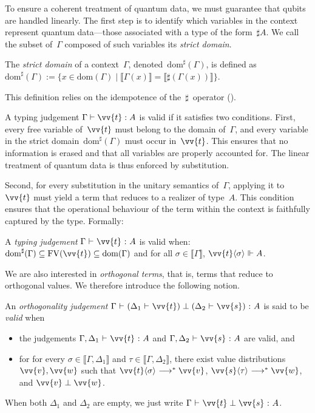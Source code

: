 \documentclass[runningheads,orivec,envcountsame,envcountsect]{llncs}
\newcommand\lra{\longrightarrow}
\newcommand\ansubst[2]{\ensuremath{\langle #1 \rangle_{#2}}}
\newcommand\dom[1]{\mathrm{dom}(#1)}
\newcommand\sdom[1]{\mathrm{dom}^{\sharp}(#1)}
\newcommand\FV[1]{\mathrm{FV}(#1)}
\def\eval{\lra^*}
\def\sem#1{\llbracket#1\rrbracket}
\def\TYP#1#2#3{#1~{\vdash}~#2~{:}~#3}
\def\SORTH#1#2#3#4{#1~{\vdash}~#2\perp#3~{:}~#4}
\def\ORTH#1#2#3#4#5#6{#1~{\vdash}~(#2~{\vdash}~#3)\perp(#4~{\vdash}~#5)~{:}~#6}
\def\real{\Vdash}
\begin{document}
To ensure a coherent treatment of quantum data, we must guarantee that qubits
are handled linearly. The first step is to identify which variables in the
context represent quantum data---those associated with a type of the
form~$\sharp A$. We call the subset of~$\Gamma$ composed of such variables its
\emph{strict domain}.

\begin{definition}
  The \emph{strict domain} of a context~$\Gamma$, denoted~$\sdom{\Gamma}$, is
  defined as
  \(
    \sdom{\Gamma} :=
    \{x \in \dom{\Gamma} \mid
    \sem{\Gamma(x)} = \sem{\sharp(\Gamma(x))}\}
  \).
\end{definition}

This definition relies on the idempotence of the~$\sharp$~operator
().


A typing judgement $\Gamma\vdash \vv{t}:A$ is valid if it satisfies two
conditions.  First, every free variable of~$\vv{t}$ must belong to the domain
of~$\Gamma$, and every variable in the strict domain~$\sdom{\Gamma}$ must occur
in~$\vv{t}$.  This ensures that no information is erased and that all variables
are properly accounted for.  The linear treatment of quantum data is thus
enforced by substitution.

Second, for every substitution in the unitary semantics of~$\Gamma$, applying
it to~$\vv{t}$ must yield a term that reduces to a realizer of type~$A$.  This
condition ensures that the operational behaviour of the term within the context
is faithfully captured by the type.  Formally:

\begin{definition}
  A \emph{typing judgement} $\TYP{\Gamma}{\vv{t}}{A}$ is valid when:
    $\sdom{\Gamma}\subseteq\FV{\vv{t}}\subseteq\dom{\Gamma}$
    and
    for all $\sigma\in\sem{\Gamma}$, 
          $\vv{t}\ansubst{\sigma}{}\real A$.
\end{definition}

We are also interested in \emph{orthogonal terms}, that is, terms that reduce
to orthogonal values.  
We therefore introduce the following notion.

\begin{definition}
  An \emph{orthogonality judgement}
  $\ORTH{\Gamma}{\Delta_1}{\vv{t}}{\Delta_2}{\vv{s}}{A}$
  is said to be \emph{valid} when
  \begin{itemize}
    \item 
  the judgements
      $\TYP{\Gamma,\Delta_1}{\vv{t}}{A}$ and
      $\TYP{\Gamma,\Delta_2}{\vv{s}}{A}$ are valid, and
    \item for
      for every
      $\sigma\in\sem{\Gamma,\Delta_1}$ and
      $\tau\in\sem{\Gamma,\Delta_2}$,
      there exist value distributions $\vv{v},\vv{w}$ such that
      $\vv{t}\ansubst{\sigma}{}\eval\vv{v}$,
      $\vv{s}\ansubst{\tau}{}\eval\vv{w}$,
      and $\vv{v}\perp\vv{w}$.
  \end{itemize}
When both $\Delta_1$ and $\Delta_2$ are empty,
we just write
$\SORTH{\Gamma}{\vv{t}}{\vv{s}}{A}$.
\end{definition}
\end{document}
